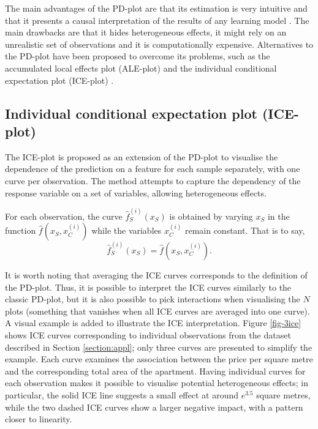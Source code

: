 \documentclass[smallextended,natbib]{svjour3}\usepackage[]{graphicx}\usepackage[]{xcolor}
\newcommand{\1}[1]{\mathbbm{1}_{#1}}
\begin{document}
The main advantages of the PD-plot are that its estimation is very intuitive and that it presents a causal interpretation of the results of any learning model \citep{zhao2021causal}. The main drawbacks are that it hides heterogeneous effects, it might rely on an unrealistic set of observations and it is computationally expensive. Alternatives to the PD-plot have been proposed to overcome its problems, such as the accumulated local effects plot (ALE-plot) \citep{apley2020visualizing} and the individual conditional expectation plot (ICE-plot) \citep{goldstein2015peeking}.

\subsection{Individual conditional expectation plot (ICE-plot)} \label{sub:ICE}

The ICE-plot is proposed as an extension of the PD-plot to visualise the dependence of the prediction on a feature for each sample separately, with one curve per observation. The method attempts to capture the dependency of the response variable on a set of variables, allowing heterogeneous effects.

For each observation, the curve $\hat f_{S}^{(i)}(x_S)$ is obtained by varying $x_S$ in the function $\hat f(x_S,x_C^{(i)})$ while the variables $x_C^{(i)}$ remain constant. That is to say,
\begin{equation}
 \hat f_{S}^{(i)}(x_S)= \hat f(x_S, x_C^{(i)}). 
\end{equation}

It is worth noting that averaging the ICE curves corresponds to the definition of the PD-plot. 
Thus, it is possible to interpret the ICE curves similarly to the classic PD-plot, but it is also possible to pick interactions when visualising the $N$ plots (something that vanishes when all ICE curves are averaged into one curve). A visual example is added to illustrate the ICE interpretation. Figure \ref{fig-3ice} shows ICE curves corresponding to individual observations from the dataset described in Section \ref{section:appl}; only three curves are presented to simplify the example. Each curve examines the association between the price per square metre and the corresponding total area of the apartment. Having individual curves for each observation makes it possible to visualise potential heterogeneous effects; in particular, the solid ICE line suggests a small effect at around $e^{3.5}$ square metres, while the two dashed ICE curves show a larger negative impact, with a pattern closer to linearity. 
\end{document}
